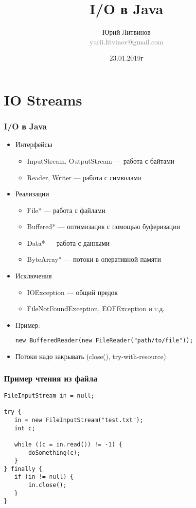 \documentclass[xetex,mathserif,serif]{beamer}
\title{I/O в Java}
\author[Юрий Литвинов]{Юрий Литвинов\\\small{\textcolor{gray}{yurii.litvinov@gmail.com}}}
\date{23.01.2019г}
\begin{document}
	\frame{\titlepage}

	\section{IO Streams}

	\begin{frame}[fragile]
		\frametitle{I/O в Java}
		\begin{itemize}
			\item Интерфейсы
			\begin{itemize}
				\item InputStream, OutputStream --- работа с байтами
				\item Reader, Writer --- работа с символами
			\end{itemize}
			\item Реализации
			\begin{itemize}
				\item File* --- работа с файлами
				\item Buffered* --- оптимизация с помощью буферизации
				\item Data* --- работа с данными
				\item ByteArray* --- потоки в оперативной памяти
			\end{itemize}
			\item Исключения
			\begin{itemize}
				\item IOException --- общий предок
				\item FileNotFoundException, EOFException и т.д.
			\end{itemize}
			\item Пример:
				\begin{verbatim}
new BufferedReader(new FileReader("path/to/file"));
				\end{verbatim}
			\item Потоки надо закрывать (close(), try-with-resource)
		\end{itemize}
	\end{frame}

	\begin{frame}[fragile]
		\frametitle{Пример чтения из файла}
		\begin{verbatim}
FileInputStream in = null;

try {
   in = new FileInputStream("test.txt");
   int c;

   while ((c = in.read()) != -1) {
       doSomething(c);
   }
} finally {
   if (in != null) {
       in.close();
   }
}
		\end{verbatim}
	\end{frame}
\end{document}
